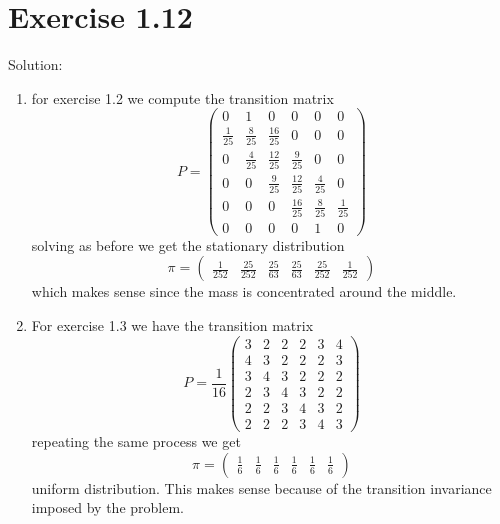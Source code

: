 \documentclass[11pt]{article}
\newcommand{\solution}[1]{{{\textcolor{header}{Solution:} \textcolor{solution}{#1}}}}
\begin{document}
\section{Exercise 1.12}
\solution{
    \begin{enumerate}
        \item for exercise 1.2 we compute the transition matrix
            \[
                P = \begin{pmatrix} 0 & 1 & 0 & 0 & 0 & 0\\
                    \frac{1}{25} & \frac{8}{25} & \frac{16}{25} & 0 & 0 & 0\\
                    0 & \frac{4}{25} & \frac{12}{25} & \frac{9}{25} & 0 & 0\\
                    0 & 0 & \frac{9}{25} & \frac{12}{25} & \frac{4}{25} & 0\\
                    0 & 0 & 0 & \frac{16}{25} & \frac{8}{25} & \frac{1}{25}\\
                    0 & 0 & 0 & 0 & 1 & 0
                \end{pmatrix} 
            \] 
            solving as before we get the stationary distribution
            \[
                \pi = \begin{pmatrix} \frac{1}{252} & \frac{25}{252} & \frac{25}{63} & \frac{25}{63} & \frac{25}{252} & \frac{1}{252} \end{pmatrix} 
            \] 
            which makes sense since the mass is concentrated around the middle.
        \item For exercise 1.3 we have the transition matrix
            \[
            P = \frac{1}{16}\begin{pmatrix} 
                3 & 2 & 2 & 2 & 3 & 4\\
                4 & 3 & 2 & 2 & 2 & 3\\
                3 & 4 & 3 & 2 & 2 & 2\\
                2 & 3 & 4 & 3 & 2 & 2\\
                2 & 2 & 3 & 4 & 3 & 2\\
                2 & 2 & 2 & 3 & 4 & 3
            \end{pmatrix} 
            \] 
            repeating the same process we get
            \[
                \pi = \begin{pmatrix} \frac{1}{6} & \frac{1}{6} & \frac{1}{6} & \frac{1}{6} & \frac{1}{6} & \frac{1}{6} \end{pmatrix} 
            \] 
            uniform distribution. This makes sense because of the transition invariance imposed by the problem.

\end{enumerate}}
\end{document}
